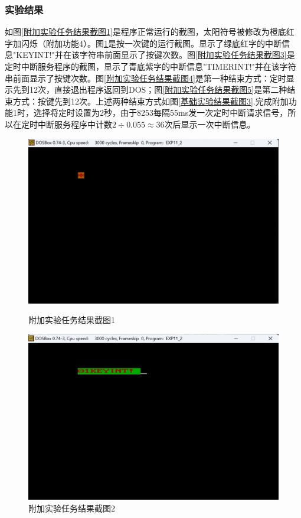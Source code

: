 \documentclass[12pt, a4paper, oneside]{ctexart}
\begin{document}
\subsubsection{实验结果}
如图\ref{附加实验任务结果截图1}是程序正常运行的截图，太阳符号被修改为橙底红字加闪烁（附加功能4）。图\ref{附加实验任务结果截图2}是按一次键的运行截图。显示了绿底红字的中断信息"KEYINT!"并在该字符串前面显示了按键次数。图\ref{附加实验任务结果截图3}是定时中断服务程序的截图，显示了青底紫字的中断信息"TIMERINT!"并在该字符串前面显示了按键次数。图\ref{附加实验任务结果截图4}是第一种结束方式：定时显示先到12次，直接退出程序返回到DOS；图\ref{附加实验任务结果截图5}是第二种结束方式：按键先到12次。上述两种结束方式如图\ref{基础实验结果截图3}.完成附加功能1时，选择将定时设置为2秒，由于8253每隔55ms发一次定时中断请求信号，所以在定时中断服务程序中计数$2 \div 0.055 \approx 36$次后显示一次中断信息。
\begin{figure}[H]
    \centering
    \begin{minipage}{0.45\textwidth}
    \centering
    \includegraphics[scale=0.4]{pic/exp11-2-1.png}
    \caption{附加实验任务结果截图1}
    \label{附加实验任务结果截图1}
    \end{minipage}
    \hspace{0.05\textwidth}
    \begin{minipage}{0.45\textwidth}
    \centering
    \includegraphics[scale=0.4]{pic/exp11-2-2.png}
    \caption{附加实验任务结果截图2}
    \label{附加实验任务结果截图2}
    \end{minipage}
\end{figure}
\end{document}

